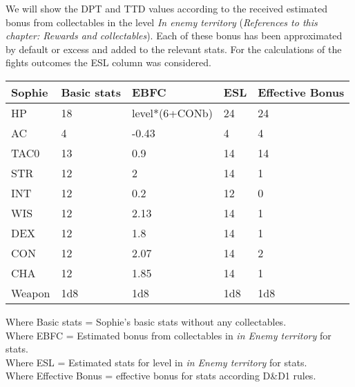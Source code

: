 We will show the DPT and TTD values according to the received estimated bonus from collectables in the level \textit{In enemy territory} (\textit{References to this chapter: Rewards and collectables}). Each of these bonus has been approximated by default or excess and added to the relevant stats. For the calculations of the fights outcomes the ESL column was considered.
\begin{table}[H]
  \centering
\begin{tabular}{|l|l|l|l|l|}
\hline
\rowcolor[HTML]{C0C0C0} 
\textbf{Sophie} & \textbf{Basic stats} & \textbf{EBFC} & \textbf{ESL} & \textbf{Effective Bonus} \\ \hline
HP & 18 & level*(6+CONb) & 24 & 24 \\ \hline
AC & 4 & -0.43 & 4 & 4 \\ \hline
TAC0 & 13 & 0.9 & 14 & 14 \\ \hline
STR & 12 & 2 & 14 & 1 \\ \hline
INT & 12 & 0.2 & 12 & 0 \\ \hline
WIS & 12 & 2.13 & 14 & 1 \\ \hline
DEX & 12 & 1.8 & 14 & 1 \\ \hline
CON & 12 & 2.07 & 14 & 2 \\ \hline
CHA & 12 & 1.85 & 14 & 1 \\ \hline
Weapon & 1d8 & 1d8 & 1d8 & 1d8 \\ \hline
\end{tabular}
\end{table}
Where Basic stats = Sophie's basic stats without any collectables.\\
Where EBFC = Estimated bonus from collectables in \textit{in Enemy territory} for stats. \\
Where ESL = Estimated stats for level in \textit{in Enemy territory} for stats.\\
Where Effective Bonus = effective bonus for stats according D&D1 rules.\\

